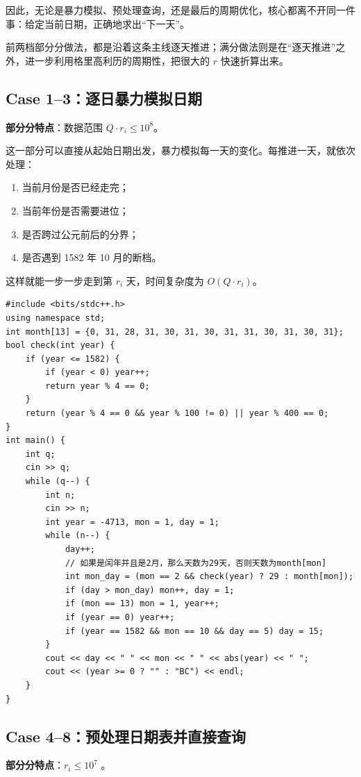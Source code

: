 \documentclass{book}
\begin{document}
因此，无论是暴力模拟、预处理查询，还是最后的周期优化，核心都离不开同一件事：给定当前日期，正确地求出“下一天”。

前两档部分分做法，都是沿着这条主线逐天推进；满分做法则是在“逐天推进”之外，进一步利用格里高利历的周期性，把很大的 $r$ 快速折算出来。

\subsection{Case 1--3：逐日暴力模拟日期}
\textbf{部分分特点}：数据范围 $Q\cdot r_i \leq 10^8$。

这一部分可以直接从起始日期出发，暴力模拟每一天的变化。每推进一天，就依次处理：

\begin{enumerate}[leftmargin=2em,itemsep=1pt,topsep=2pt,parsep=0pt,partopsep=0pt]
    \item 当前月份是否已经走完；
    \item 当前年份是否需要进位；
    \item 是否跨过公元前后的分界；
    \item 是否遇到 1582 年 10 月的断档。
\end{enumerate}

这样就能一步一步走到第 $r_i$ 天，时间复杂度为 $O(Q\cdot r_i)$。
\newpage
        \begin{lstlisting}[style = code]
#include <bits/stdc++.h>
using namespace std;
int month[13] = {0, 31, 28, 31, 30, 31, 30, 31, 31, 30, 31, 30, 31};
bool check(int year) {
    if (year <= 1582) {
        if (year < 0) year++;
        return year % 4 == 0;
    }
    return (year % 4 == 0 && year % 100 != 0) || year % 400 == 0;
}
int main() {
    int q;
    cin >> q;
    while (q--) {
        int n;
        cin >> n;
        int year = -4713, mon = 1, day = 1;
        while (n--) {
            day++;
            // 如果是闰年并且是2月，那么天数为29天，否则天数为month[mon]
            int mon_day = (mon == 2 && check(year) ? 29 : month[mon]);
            if (day > mon_day) mon++, day = 1;
            if (mon == 13) mon = 1, year++;
            if (year == 0) year++;
            if (year == 1582 && mon == 10 && day == 5) day = 15;
        }
        cout << day << " " << mon << " " << abs(year) << " ";
        cout << (year >= 0 ? "" : "BC") << endl;
    }
}\end{lstlisting}
        
    
\newpage
\subsection{Case 4--8：预处理日期表并直接查询}
\textbf{部分分特点}：$r_i \leq 10^7$ 。
\end{document}
